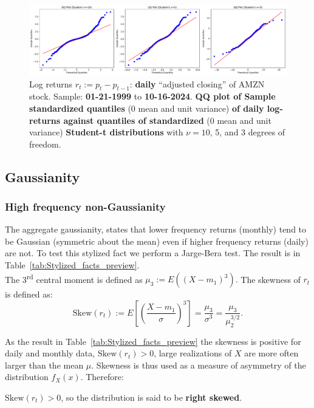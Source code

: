 \documentclass{article}
\begin{document}
\begin{figure}[H]
    \centering
    \includegraphics[width=1\textwidth]{Img/qqplt_tstudents_AMZNdaily.pdf}
    \caption{Log returns $r_t := p_t - p_{t-1}$: \textbf{daily} “adjusted closing” of AMZN stock. 
    Sample: \textbf{01-21-1999} to \textbf{10-16-2024}. \textbf{QQ plot of Sample standardized quantiles} (0 mean and unit variance) \textbf{of daily log-returns against quantiles of standardized} (0 mean and unit variance) \textbf{Student-t distributions} with $\nu = 10$, 5, and 3 degrees of freedom.}
    \label{fig:Hstogram_QQ_plot_T_student}
\end{figure}
\subsection{Gaussianity}
\subsubsection{High frequency non-Gaussianity}

The aggregate gaussianity, states that lower frequency returns (monthly) tend to be Gaussian (symmetric about the mean) even if higher frequency returns (daily) are not. 
To test this stylized fact we perform a Jarge-Bera test. The result is in Table~\ref{tab:Stylized_facts_preview}. \\

\noindent The 3\textsuperscript{rd} central moment is defined as
$\mu_3 := E((X - m_1)^3).$ The skewness of \( r_t \) is defined as:
\[
\text{Skew}(r_t) := E \left[ \left( \frac{X - m_1}{\sigma} \right)^3 \right] = \frac{\mu_3}{\sigma^3} = \frac{\mu_3}{\mu_2^{3/2}}.
\]

\noindent As the result in Table~\ref{tab:Stylized_facts_preview} 
the skewness is positive for daily and monthly data, \( \text{Skew}(r_t) >0 \), large realizations of \( X \) are more often larger
than the mean \( \mu \). 
Skewness is thus used as a measure of asymmetry of the distribution \( f_X(x) \). Therefore:
 
\( \text{Skew}(r_t) > 0 \), so the distribution is said to be \textbf{right skewed}. 
\end{document}
